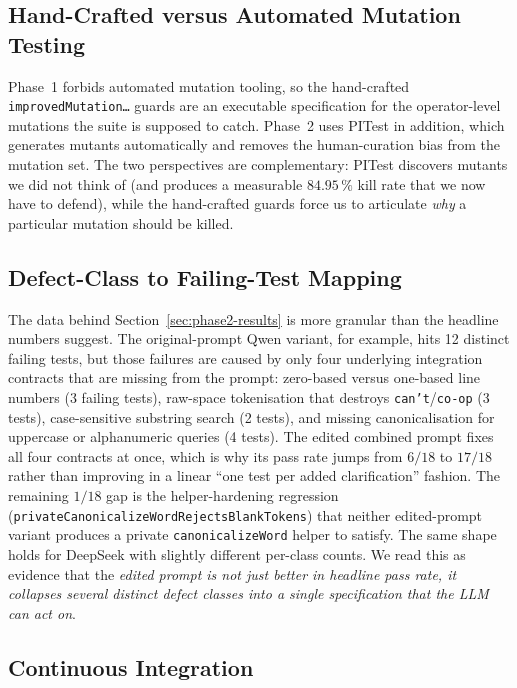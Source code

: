 \documentclass[journal]{IEEEtran}
\begin{document}
\subsection{Hand-Crafted versus Automated Mutation Testing}
Phase~1 forbids automated mutation tooling, so the hand-crafted
\texttt{improvedMutation\ldots} guards are an executable specification
for the operator-level mutations the suite is supposed to catch.
Phase~2 uses PITest in addition, which generates mutants automatically
and removes the human-curation bias from the mutation set. The two
perspectives are complementary: PITest discovers mutants we did not
think of (and produces a measurable $84.95\,\%$ kill rate that we now
have to defend), while the hand-crafted guards force us to articulate
\emph{why} a particular mutation should be killed.

\subsection{Defect-Class to Failing-Test Mapping}

The data behind Section~\ref{sec:phase2-results} is more granular than
the headline numbers suggest. The original-prompt Qwen variant, for
example, hits 12 distinct failing tests, but those failures are caused
by only four underlying integration contracts that are missing from the
prompt: zero-based versus one-based line numbers (3 failing tests),
raw-space tokenisation that destroys \texttt{can't}/\texttt{co-op}
(3 tests), case-sensitive substring search (2 tests), and missing
canonicalisation for uppercase or alphanumeric queries (4 tests). The
edited combined prompt fixes all four contracts at once, which is why
its pass rate jumps from $6/18$ to $17/18$ rather than improving in a
linear ``one test per added clarification'' fashion. The remaining
$1/18$ gap is the helper-hardening regression
(\texttt{privateCanonicalizeWordRejectsBlankTokens}) that neither
edited-prompt variant produces a private \texttt{canonicalizeWord}
helper to satisfy. The same shape holds for DeepSeek with slightly
different per-class counts. We read this as evidence that the
\emph{edited prompt is not just better in headline pass rate, it
collapses several distinct defect classes into a single specification
that the LLM can act on}.

\subsection{Continuous Integration}
\end{document}
